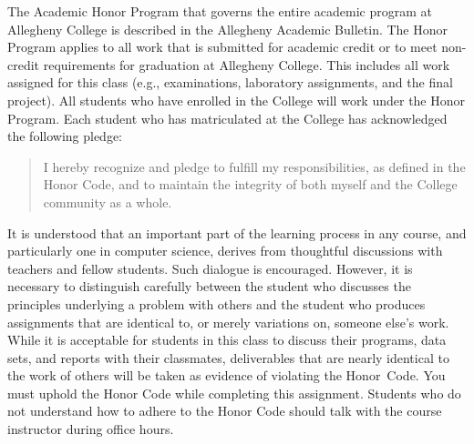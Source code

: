 \documentclass[11pt]{article}
\begin{document}
The Academic Honor Program that governs the entire academic program at Allegheny
College is described in the Allegheny Academic Bulletin. The Honor Program
applies to all work that is submitted for academic credit or to meet non-credit
requirements for graduation at Allegheny College. This includes all work
assigned for this class (e.g., examinations, laboratory assignments, and the
final project). All students who have enrolled in the College will work under
the Honor Program. Each student who has matriculated at the College has
acknowledged the following pledge:

\begin{quote}
  I hereby recognize and pledge to fulfill my responsibilities, as defined in
  the Honor Code, and to maintain the integrity of both myself and the College
  community as a whole.
\end{quote}

\noindent It is understood that an important part of the learning process in any
course, and particularly one in computer science, derives from thoughtful
discussions with teachers and fellow students. Such dialogue is encouraged.
However, it is necessary to distinguish carefully between the student who
discusses the principles underlying a problem with others and the student who
produces assignments that are identical to, or merely variations on, someone
else's work. While it is acceptable for students in this class to discuss their
programs, data sets, and reports with their classmates, deliverables that are
nearly identical to the work of others will be taken as evidence of violating
the \mbox{Honor Code}. You must uphold the Honor Code while completing this
assignment. Students who do not understand how to adhere to the Honor Code
should talk with the course instructor during office hours.
\end{document}
